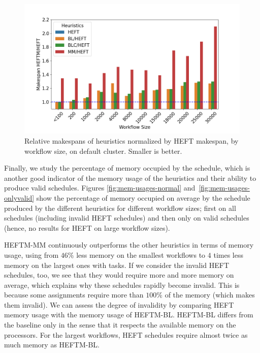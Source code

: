 \documentclass[conference]{IEEEtran}
\newcommand{\algo}[1]{\textsc{#1}}
\newcommand{\heft}{\algo{HEFT}\xspace}
\newcommand{\heftmm}{\algo{HEFTM-MM}\xspace}
\newcommand{\heftbl}{\algo{HEFTM-BL}\xspace}
\begin{document}
\begin{figure}[tb]
    \centering
  \vspace{-0.34cm}
  \includegraphics[width=1\columnwidth] {images/ms_relations_by_wf_size_barplot}
    \caption{Relative makespans of heuristics normalized by \heft makespan, by workflow
    size, on default cluster. Smaller is better.}
    \label{fig:ms-relations-by-workflow}
\end{figure}


Finally, we study the percentage of memory occupied by the schedule, which is another good indicator
of the memory usage of the heuristics and their ability to produce valid schedules.  %
Figures \ref{fig:mem-usages-normal} and~\ref{fig:mem-usages-onlyvalid} show the percentage of memory
occupied on average by the schedule
produced by the different heuristics for different workflow sizes;
first on all schedules (including invalid \heft schedules) and then only on 
valid schedules (hence, no results for \heft on large workflow sizes).
%


\heftmm continuously outperforms the other heuristics in terms of memory usage,
using from $46\%$ less memory on the smallest
workflows to $4$ times less memory on the largest ones with  tasks.
If we consider the invalid \heft schedules, too, we see that they would require more and more memory on average,
which explains why these schedules rapidly become invalid.
This is because some assignments require more than $100\%$ of the memory (which makes them invalid).
We can assess the degree of invalidity by comparing \heft memory usage with the memory usage of \heftbl.
\heftbl differs from the baseline only in the sense that it respects the available memory on the processors.
For the largest workflows, \heft schedules require almost twice as much memory as \heftbl.
\end{document}
